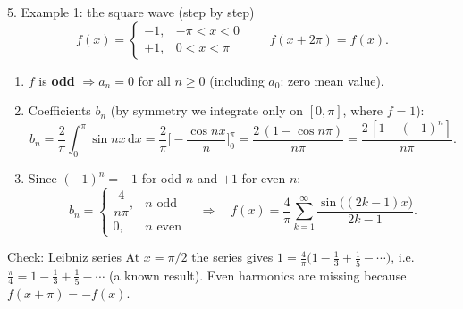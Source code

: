 \documentclass[aspectratio=169,10pt]{beamer}
\newcommand{\dd}{\,\mathrm{d}}
\begin{document}
\begin{frame}{5. Example 1: the square wave (step by step)}
  \small
  \[
    f(x)=\begin{cases}-1,&-\pi<x<0\\ +1,&0<x<\pi\end{cases}\qquad f(x+2\pi)=f(x).
  \]
  \begin{enumerate}
    \item $f$ is \textbf{odd} $\Rightarrow a_n=0$ for all $n\ge0$ (including $a_0$: zero mean value).
    \item Coefficients $b_n$ (by symmetry we integrate only on $[0,\pi]$, where $f=1$):
    \[
      b_n=\frac2\pi\int_0^\pi\sin nx\dd x=\frac2\pi\Big[-\frac{\cos nx}{n}\Big]_0^\pi
      =\frac{2\,(1-\cos n\pi)}{n\pi}=\frac{2\,[1-(-1)^n]}{n\pi}.
    \]
    \item Since $(-1)^n=-1$ for odd $n$ and $+1$ for even $n$:
    \[
      b_n=\begin{cases}\dfrac{4}{n\pi},& n\text{ odd}\\[4pt] 0,& n\text{ even}\end{cases}
      \quad\Longrightarrow\quad
      f(x)=\frac4\pi\sum_{k=1}^{\infty}\frac{\sin\big((2k-1)x\big)}{2k-1}.
    \]
  \end{enumerate}
  \begin{keybox}{Check: Leibniz series}
    At $x=\pi/2$ the series gives $1=\frac4\pi\big(1-\frac13+\frac15-\cdots\big)$, i.e. $\frac\pi4=1-\frac13+\frac15-\cdots$ (a known result). Even harmonics are missing because $f(x+\pi)=-f(x)$.
  \end{keybox}
\end{frame}
\end{document}
